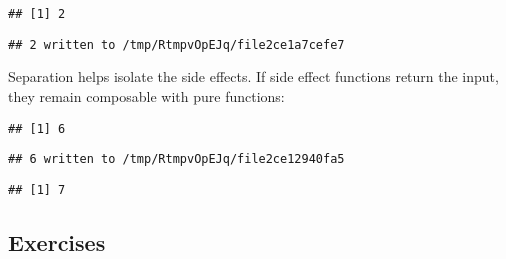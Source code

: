 \documentclass[]{book}
\newenvironment{Shaded}{\begin{snugshade}}{\end{snugshade}}
\newcommand{\DecValTok}[1]{\textcolor[rgb]{0.00,0.00,0.81}{#1}}
\newcommand{\KeywordTok}[1]{\textcolor[rgb]{0.13,0.29,0.53}{\textbf{#1}}}
\newcommand{\NormalTok}[1]{#1}
\newcommand{\OperatorTok}[1]{\textcolor[rgb]{0.81,0.36,0.00}{\textbf{#1}}}
\newcommand{\StringTok}[1]{\textcolor[rgb]{0.31,0.60,0.02}{#1}}
\begin{document}
\begin{verbatim}
## [1] 2
\end{verbatim}

\begin{verbatim}
## 2 written to /tmp/RtmpvOpEJq/file2ce1a7cefe7
\end{verbatim}

Separation helps isolate the side effects.
If side effect functions return the input, they remain composable with pure functions:

\begin{Shaded}
\end{Shaded}

\begin{verbatim}
## [1] 6
\end{verbatim}

\begin{verbatim}
## 6 written to /tmp/RtmpvOpEJq/file2ce12940fa5
\end{verbatim}

\begin{verbatim}
## [1] 7
\end{verbatim}

\hypertarget{exercises-17}{%
\subsection{Exercises}\label{exercises-17}}
\end{document}
